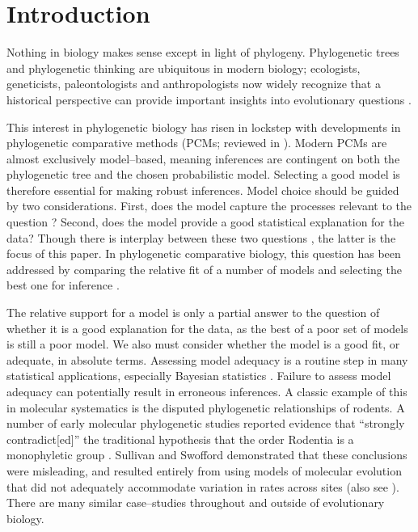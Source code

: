 \documentclass[a4paper,12pt]{article}
\begin{document}
\section{Introduction}
Nothing in biology makes sense except in light of phylogeny. Phylogenetic trees and phylogenetic thinking are ubiquitous in modern biology; ecologists, geneticists, paleontologists and anthropologists now widely recognize that a historical perspective can provide important insights into evolutionary questions \citep{PennellHarmon}. 

This interest in phylogenetic biology has risen in lockstep with developments in phylogenetic comparative methods (PCMs; reviewed in \citep{PennellHarmon, Omeara2012}). Modern PCMs are almost exclusively model--based, meaning inferences are contingent on both the phylogenetic tree and the chosen probabilistic model. Selecting a good model is therefore essential for making robust inferences. Model choice should be guided by two considerations. First, does the model capture the processes relevant to the question \citep{HansenOrzack2005, Hansen2012, PennellPE}? Second, does the model provide a good statistical explanation for the data? Though there is interplay between these two questions \citep{Hansen2012}, the latter is the focus of this paper. In phylogenetic comparative biology, this question has been addressed by comparing the relative fit of a number of models and selecting the best one for inference \citep{Mooers1999, Harmon2010, Hunt2012}. 

The relative support for a model is only a partial answer to the question of whether it is a good explanation for the data, as the best of a poor set of models is still a poor model. We also must consider whether the model is a good fit, or adequate, in absolute terms. Assessing model adequacy is a routine step in many statistical applications, especially Bayesian statistics \citep{Gelmanbook}. Failure to assess model adequacy can potentially result in erroneous inferences. A classic example of this in molecular systematics is the disputed phylogenetic relationships of rodents. A number of early molecular phylogenetic studies reported evidence that ``strongly contradict[ed]'' the traditional hypothesis that the order Rodentia is a monophyletic group \citep{Graur1991, DErchia1996}. Sullivan and Swofford \citep{SullivanSwofford} demonstrated that these conclusions were misleading, and resulted entirely from using models of molecular evolution that did not adequately accommodate variation in rates across sites (also see \citep{Brown2013}). There are many similar case--studies throughout and outside of evolutionary biology.
\end{document}
